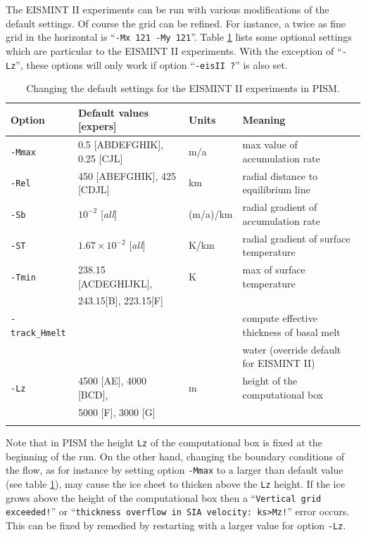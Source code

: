 \documentclass[11pt,final]{amsart}
\renewcommand{\t}[1]{\texttt{#1}}
\begin{document}
The EISMINT II experiments can be run with various modifications of the default settings.  Of course the grid can be refined.  For instance, a twice as fine grid in the horizontal is ``\t{-Mx 121 -My 121}''.  Table \ref{tab:eisIIoptions} lists some optional settings which are particular to the EISMINT II experiments.  With the exception of ``\verb|-Lz|'', these options will only work if option ``\t{-eisII ?}'' is also set.

\begin{table}[ht]
\caption{Changing the default settings for the EISMINT II experiments in PISM.}\label{tab:eisIIoptions}
\small
\begin{tabular}{@{}llll}\hline
\textbf{Option} & \textbf{Default values [expers]} & \textbf{Units} & \textbf{Meaning} \\ \hline
\verb|-Mmax| & 0.5 [ABDEFGHIK], 0.25 [CJL] & m$/$a & max value of accumulation rate \\
\verb|-Rel| & 450 [ABEFGHIK], 425 [CDJL] & km & radial distance to equilibrium line \\
\verb|-Sb| & $10^{-2}$ [\emph{all}] & (m/a)/km & radial gradient of accumulation rate \\
\verb|-ST| & $1.67 \times 10^{-2}$ [\emph{all}] & K/km & radial gradient of surface temperature\\
\verb|-Tmin| & 238.15 [ACDEGHIJKL], & K & max of surface temperature \\
 & 243.15[B], 223.15[F] & & \\
\verb|-track_Hmelt| &  &  & compute effective thickness of basal melt \\
 &  &  & water (override default for EISMINT II) \\
\verb|-Lz| & 4500 [AE], 4000 [BCD], & m & height of the computational box \\
 & 5000 [F], 3000 [G] &  &  \\
\hline\normalsize
\end{tabular}\end{table}

Note that in PISM the height \verb|Lz| of the computational box is fixed at the beginning of the run.  On the other hand, changing the boundary conditions of the flow, as for instance by setting option \verb|-Mmax| to a larger than default value (see table \ref{tab:eisIIoptions}), may cause the ice sheet to thicken above the \verb|Lz| height.  If the ice grows above the height of the computational box then a ``\verb|Vertical grid exceeded!|'' or ``\verb|thickness overflow in SIA velocity: ks>Mz!|'' error occurs.  This can be fixed by remedied by restarting with a larger value for option \verb|-Lz|.
\end{document}
